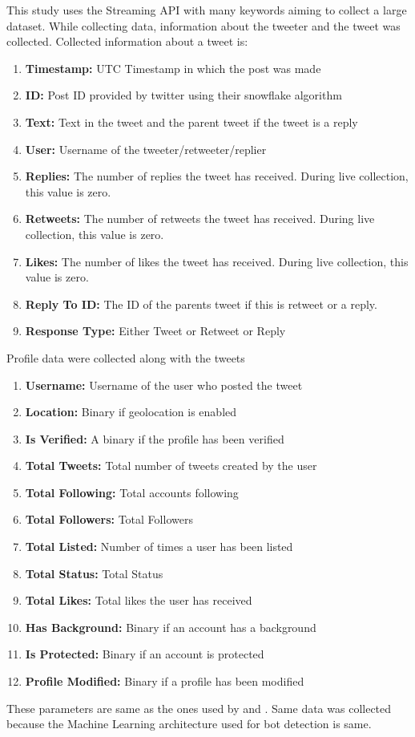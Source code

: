 \documentclass[letterpaper]{article}
\begin{document}
\par This study uses the Streaming API with many keywords aiming to collect a large dataset. While collecting data, information about the tweeter and the tweet was collected. 
Collected information about a tweet is:
\begin{enumerate}[label=\textbf{\arabic*}]
    \item \textbf{Timestamp:} UTC Timestamp in which the post was made
    \item \textbf{ID:} Post ID provided by twitter using their snowflake algorithm
    \item \textbf{Text:} Text in the tweet and the parent tweet if the tweet is a reply
    \item \textbf{User:} Username of the tweeter/retweeter/replier
    \item \textbf{Replies:} The number of replies the tweet has received. During live collection, this value is zero.
    \item \textbf{Retweets:} The number of retweets the tweet has received. During live collection, this value is zero.
    \item \textbf{Likes:} The number of likes the tweet has received. During live collection, this value is zero.
    \item \textbf{Reply To ID:} The ID of the parents tweet if this is retweet or a reply.
    \item \textbf{Response Type:} Either Tweet or Retweet or Reply
\end{enumerate}
\bigskip
Profile data were collected along with the tweets

\begin{enumerate}[label=\textbf{\arabic*}]
    \item \textbf{Username:} Username of the user who posted the tweet
    \item \textbf{Location:} Binary if geolocation is enabled
    \item \textbf{Is Verified:} A binary if the profile has been verified
    \item \textbf{Total Tweets:} Total number of tweets created by the user
    \item \textbf{Total Following:} Total accounts following
    \item \textbf{Total Followers:} Total Followers
    \item \textbf{Total Listed:} Number of times a user has been listed
    \item \textbf{Total Status:} Total Status
    \item \textbf{Total Likes:} Total likes the user has received
    \item \textbf{Has Background:}  Binary if an account has a background
    \item \textbf{Is Protected:}  Binary if an account is protected
    \item \textbf{Profile Modified:}  Binary if a profile has been modified
\end{enumerate}
\bigskip
These parameters are same as the ones used by \cite{kudugunta2018deep} and \cite{ferrara2017disinformation}. Same data was collected because the Machine Learning architecture used for bot 
detection is same. \par
\end{document}
